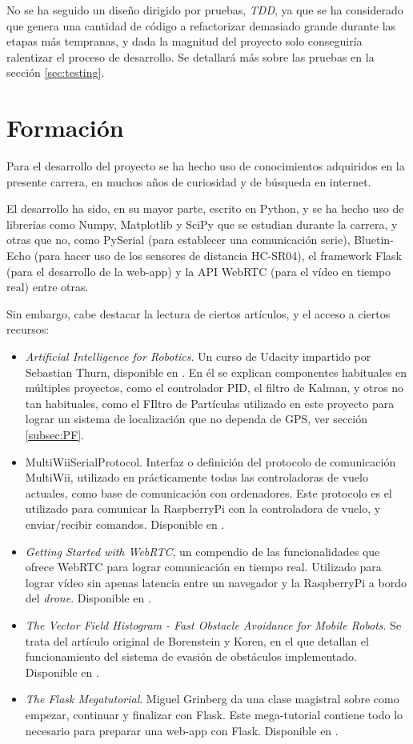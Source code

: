 No se ha seguido un diseño dirigido por pruebas, \emph{TDD}, ya que se ha considerado que genera una cantidad de código a refactorizar demasiado grande durante las etapas más tempranas, y dada la magnitud del proyecto solo conseguiría ralentizar el proceso de desarrollo. 
Se detallará más sobre las pruebas en la sección \ref{sec:testing}.


\section{Formación}

Para el desarrollo del proyecto se ha hecho uso de conocimientos adquiridos en la presente carrera, en muchos años de curiosidad y de búsqueda en internet. 

El desarrollo ha sido, en su mayor parte, escrito en Python, y se ha hecho uso de librerías como Numpy, Matplotlib y SciPy que se estudian durante la carrera, y otras que no, como PySerial (para establecer una comunicación serie), Bluetin-Echo (para hacer uso de los sensores de distancia HC-SR04), el framework Flask (para el desarrollo de la web-app) y la API WebRTC (para el vídeo en tiempo real) entre otras.

Sin embargo, cabe destacar la lectura de ciertos artículos, y el acceso a ciertos recursos:

\begin{itemize}
\item \textit{Artificial Intelligence for Robotics}. Un curso de Udacity impartido por Sebastian Thurn, disponible en \citep{wiki:UdCityPF}. En él se explican componentes habituales en múltiples proyectos, como el controlador PID, el filtro de Kalman, y otros no tan habituales, como el FIltro de Partículas utilizado en este proyecto para lograr un sistema de localización que no dependa de GPS, ver sección \ref{subsec:PF}.
\item MultiWiiSerialProtocol. Interfaz o definición del protocolo de comunicación MultiWii, utilizado en prácticamente todas las controladoras de vuelo actuales, como base de comunicación con ordenadores. Este protocolo es el utilizado para comunicar la RaspberryPi con la controladora de vuelo, y enviar/recibir comandos. Disponible en \citep{wiki:MSPDefinition}.
\item \emph{Getting Started with WebRTC}, un compendio de las funcionalidades que ofrece WebRTC para lograr comunicación en tiempo real. Utilizado para lograr vídeo sin apenas latencia entre un navegador y la RaspberryPi a bordo del \emph{drone}. Disponible en \citep{wiki:WebRTCFullDesc}.
\item \emph{The Vector Field Histogram - Fast Obstacle Avoidance for Mobile Robots}. Se trata del artículo original de Borenstein y Koren, en el que detallan el funcionamiento del sistema de evasión de obstáculos implementado. Disponible en \citep{art:BorensteinKorenVFH}.
\item \emph{The Flask Megatutorial}. Miguel Grinberg da una clase magistral sobre como empezar, continuar y finalizar con Flask. Este mega-tutorial contiene todo lo necesario para preparar una web-app con Flask. Disponible en \citep{wiki:Flask}.
\end{itemize}

